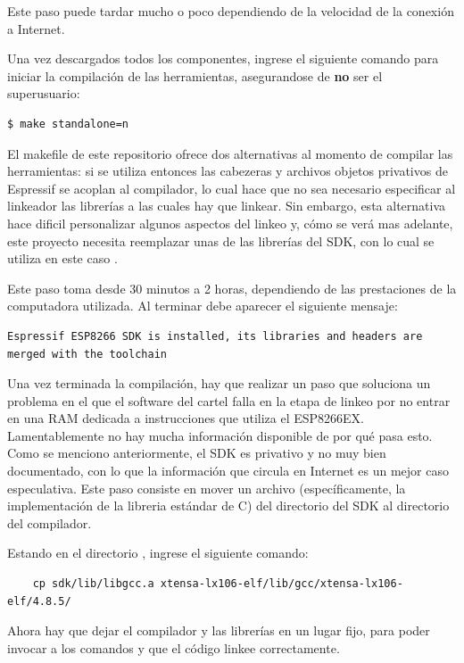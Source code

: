 Este paso puede tardar mucho o poco dependiendo de la velocidad de la conexión a Internet.

Una vez descargados todos los componentes, ingrese el siguiente comando para iniciar la compilación de las herramientas, asegurandose de {\bfseries no} ser el superusuario:

\begin{lstlisting}
$ make standalone=n
\end{lstlisting}

El makefile de este repositorio ofrece dos alternativas al momento de compilar las herramientas: si se utiliza  entonces las cabezeras y archivos objetos privativos de Espressif se acoplan al compilador, lo cual hace que no sea necesario especificar al linkeador las librerías a las cuales hay que linkear. Sin embargo, esta alternativa hace dificil personalizar algunos aspectos del linkeo y, cómo se verá mas adelante, este proyecto necesita reemplazar unas de las librerías del SDK, con lo cual se utiliza en este caso .

Este paso toma desde 30 minutos a 2 horas, dependiendo de las prestaciones de la computadora utilizada. Al terminar debe aparecer el siguiente mensaje:

\begin{lstlisting}
Espressif ESP8266 SDK is installed, its libraries and headers are merged with the toolchain
\end{lstlisting}


Una vez terminada la compilación, hay que realizar un paso que soluciona un problema en el que el software del cartel falla en la etapa de linkeo por no entrar en una RAM dedicada a instrucciones que utiliza el ESP8266EX. Lamentablemente no hay mucha información disponible de por qué pasa esto. Como se menciono anteriormente, el SDK es privativo y no muy bien documentado, con lo que la información que circula en Internet es un mejor caso especulativa. Este paso consiste en mover un archivo (específicamente, la implementación de la libreria estándar de C) del directorio del SDK al directorio del compilador.

Estando en el directorio , ingrese el siguiente comando:
\begin{lstlisting}
	cp sdk/lib/libgcc.a xtensa-lx106-elf/lib/gcc/xtensa-lx106-elf/4.8.5/
\end{lstlisting}

Ahora hay que dejar el compilador y las librerías en un lugar fijo, para poder invocar a los comandos y que el código linkee correctamente.

